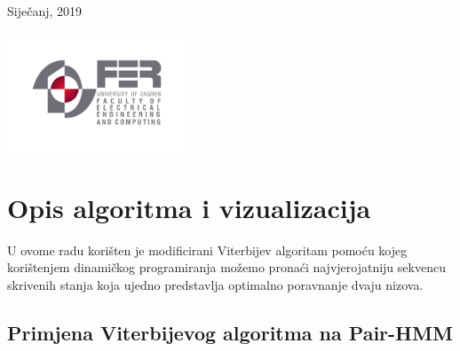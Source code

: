 \documentclass[a4paper]{article}
\begin{document}
\begin{titlepage}
	
	
	\vfill\vfill\vfill %
	
	{\large Siječanj, 2019} %
	
	
	\vfill\vfill
	\includegraphics[width=0.4\textwidth]{fer_logo.jpg}\\[1cm] %
	 
	
	\vfill %
	
\end{titlepage}
\tableofcontents
\newpage
\section{Opis algoritma i vizualizacija}
U ovome radu korišten je modificirani Viterbijev algoritam pomoću kojeg korištenjem dinamičkog programiranja možemo pronaći najvjerojatniju sekvencu skrivenih stanja koja ujedno predstavlja optimalno poravnanje dvaju nizova. \\

\subsection{Primjena Viterbijevog algoritma na Pair-HMM}
\end{document}
